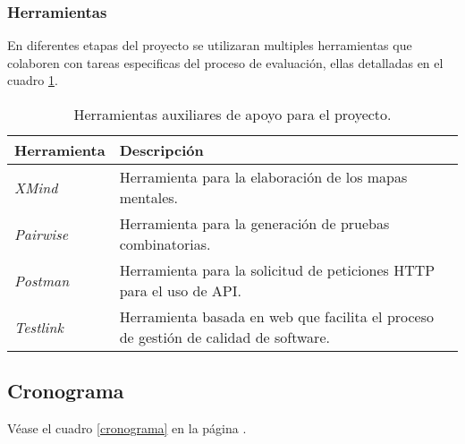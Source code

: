 \subsubsection{Herramientas}
En diferentes etapas del proyecto se utilizaran multiples herramientas que
colaboren con tareas especificas del proceso de evaluación, ellas detalladas en
el cuadro \ref{herramientas}.

\begin{table}
\centering
\begin{tabular}{|l|l|}
\hline
\textbf{Herramienta} & \textbf{Descripción} \\
\hline
\emph{XMind} & Herramienta para la elaboración de los mapas mentales. \\
\emph{Pairwise} & Herramienta para la generación de pruebas combinatorias. \\
\emph{Postman} & Herramienta para la solicitud de peticiones HTTP para el uso de API.\\
\emph{Testlink} & Herramienta basada en web que facilita el proceso de gestión de calidad de software. \\
\hline
\end{tabular}
\caption{Herramientas auxiliares de apoyo para el proyecto.}
\label{herramientas}
\end{table}

\subsection{Cronograma}
Véase el cuadro \ref{cronograma} en la página \pageref{cronograma}.

